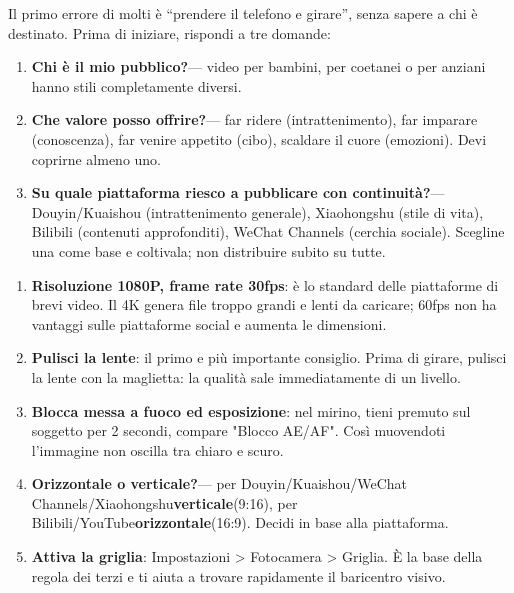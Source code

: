 


Il primo errore di molti è “prendere il telefono e girare”, senza sapere a chi è destinato. Prima di iniziare, rispondi a tre domande:

\begin{enumerate}
  \item \textbf{Chi è il mio pubblico?}— video per bambini, per coetanei o per anziani hanno stili completamente diversi.
  \item \textbf{Che valore posso offrire?}— far ridere (intrattenimento), far imparare (conoscenza), far venire appetito (cibo), scaldare il cuore (emozioni). Devi coprirne almeno uno.
  \item \textbf{Su quale piattaforma riesco a pubblicare con continuità?}— Douyin/Kuaishou (intrattenimento generale), Xiaohongshu (stile di vita), Bilibili (contenuti approfonditi), WeChat Channels (cerchia sociale). Scegline una come base e coltivala; non distribuire subito su tutte.
\end{enumerate}


\begin{enumerate}
  \item \textbf{Risoluzione 1080P, frame rate 30fps}: è lo standard delle piattaforme di brevi video. Il 4K genera file troppo grandi e lenti da caricare; 60fps non ha vantaggi sulle piattaforme social e aumenta le dimensioni.
  \item \textbf{Pulisci la lente}: il primo e più importante consiglio. Prima di girare, pulisci la lente con la maglietta: la qualità sale immediatamente di un livello.
  \item \textbf{Blocca messa a fuoco ed esposizione}: nel mirino, tieni premuto sul soggetto per 2 secondi, compare "Blocco AE/AF". Così muovendoti l'immagine non oscilla tra chiaro e scuro.
  \item \textbf{Orizzontale o verticale?}— per Douyin/Kuaishou/WeChat Channels/Xiaohongshu\textbf{verticale}(9:16), per Bilibili/YouTube\textbf{orizzontale}(16:9). Decidi in base alla piattaforma.
  \item \textbf{Attiva la griglia}: Impostazioni > Fotocamera > Griglia. È la base della regola dei terzi e ti aiuta a trovare rapidamente il baricentro visivo.
\end{enumerate}


